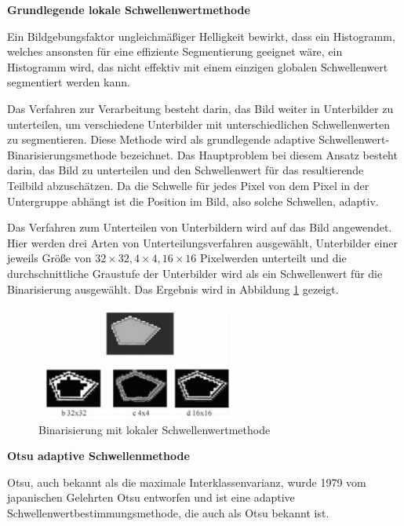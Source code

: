 \textbf{Grundlegende lokale Schwellenwertmethode}

Ein Bildgebungsfaktor ungleichmäßiger Helligkeit bewirkt, dass ein Histogramm, welches ansonsten für eine effiziente Segmentierung geeignet wäre, ein Histogramm wird, das nicht effektiv mit einem einzigen globalen Schwellenwert segmentiert werden kann.

Das Verfahren zur Verarbeitung besteht darin, das Bild weiter in Unterbilder zu unterteilen, um verschiedene Unterbilder mit unterschiedlichen Schwellenwerten zu segmentieren. Diese Methode wird als grundlegende adaptive Schwellenwert-Binarisierungsmethode bezeichnet. Das Hauptproblem bei diesem Ansatz besteht darin, das Bild zu unterteilen und den Schwellenwert für das resultierende Teilbild abzuschätzen. Da die Schwelle für jedes Pixel von dem Pixel in der Untergruppe abhängt ist die Position im Bild, also solche Schwellen, adaptiv. 

Das Verfahren zum Unterteilen von Unterbildern wird auf das Bild angewendet. Hier werden drei Arten von Unterteilungsverfahren ausgewählt, Unterbilder einer jeweils Größe von $ 32\times32, 4 \times4, 16\times16 $ Pixelwerden unterteilt und die durchschnittliche Graustufe der Unterbilder wird als ein Schwellenwert für die Binarisierung ausgewählt. Das Ergebnis wird in Abbildung \ref{fig:Binarisierung mit lokalen Schwellenwertmethode} gezeigt.

\begin{figure}[H]
 \centering 
  \includegraphics[keepaspectratio,width=0.6\textwidth]{images/4_ZweiteErfahrung/Binar/adaptive.pdf}
 \caption{Binarisierung mit lokaler Schwellenwertmethode}
 \label{fig:Binarisierung mit lokalen Schwellenwertmethode}
\end{figure} 

\textbf{Otsu adaptive Schwellenmethode}

Otsu\cite{Ostu}, auch bekannt als die maximale Interklassenvarianz, wurde 1979 vom japanischen Gelehrten Otsu entworfen und ist eine adaptive Schwellenwertbestimmungsmethode, die auch als Otsu bekannt ist.

